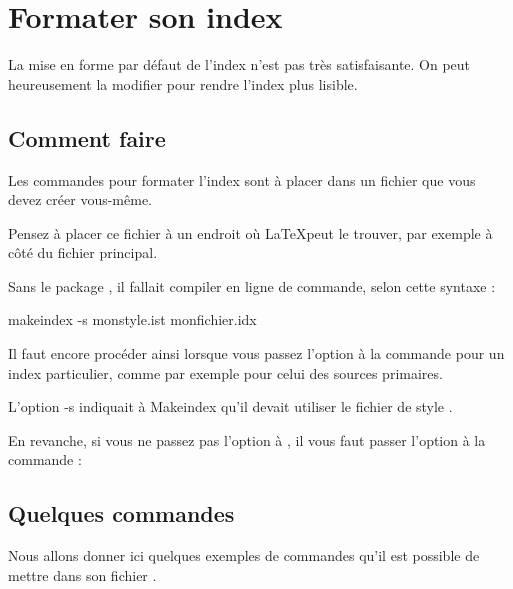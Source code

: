 \chapter{Formater son index}\label{styleindex}

\begin{intro}
La mise en forme par défaut de l'index n'est pas très satisfaisante. On peut heureusement la modifier pour rendre l'index plus lisible.
\end{intro}

\section{Comment faire}
Les commandes pour formater l'index sont à placer dans un fichier  que vous devez créer vous-même.

\begin{attention}
Pensez à placer ce fichier à un endroit où \LaTeX peut le trouver, par exemple à côté du fichier principal.
\end{attention}

Sans le package , il fallait compiler en ligne de commande, selon cette syntaxe :

\begin{bashcode}
makeindex -s monstyle.ist monfichier.idx
\end{bashcode}

Il faut encore procéder ainsi lorsque vous passez l'option  à la commande  pour un index particulier, comme par exemple pour celui des sources primaires.

L'option -s indiquait  à Makeindex  qu'il devait utiliser le fichier de style .

En revanche, si vous ne passez pas l'option  à  , il vous faut passer  l'option   à la commande  :

\begin{latexcode}
\makeindex[options=-s  monstyle.ist]
\end{latexcode}




\section{Quelques commandes}

Nous allons donner ici quelques exemples de commandes qu'il est possible de mettre dans son fichier . 

